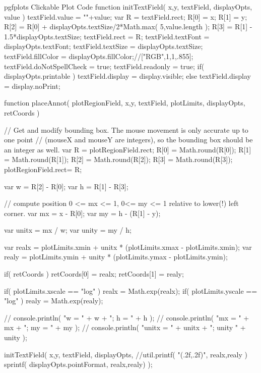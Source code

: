 {{\begin{insDLJS}[processAnnotatedPlot]{\jobname}{pgfplots Clickable Plot Code}
function initTextField( x,y, textField, displayOpts, value )
{
	textField.value = ""+value;
	var R = textField.rect;
	R[0] = x;
	R[1] = y;
	R[2] = R[0] + displayOpts.textSize/2*Math.max( 5,value.length );
	R[3] = R[1] - 1.5*displayOpts.textSize;
	textField.rect = R;
	textField.textFont = displayOpts.textFont;
	textField.textSize = displayOpts.textSize;
	textField.fillColor = displayOpts.fillColor;//["RGB",1,1,.855];
	textField.doNotSpellCheck = true;
	textField.readonly = true;
	if( displayOpts.printable )
		textField.display = display.visible;
	else
		textField.display = display.noPrint;
}

function placeAnnot( plotRegionField, x,y, textField, plotLimits, displayOpts, retCoords )
{
	// Get and modify bounding box. The mouse movement is only accurate up to one point 
	// (mouseX and mouseY are integers), so the bounding box should be an integer as well.
	var R = plotRegionField.rect;
	R[0] = Math.round(R[0]);
	R[1] = Math.round(R[1]);
	R[2] = Math.round(R[2]);
	R[3] = Math.round(R[3]);
	plotRegionField.rect= R;

	var w = R[2] - R[0];
	var h = R[1] - R[3];

	// compute position 0 <= mx <= 1, 0<= my <= 1 relative to lower(!) left corner.
	var mx = x - R[0];
	var my = h - (R[1] - y);

	var unitx = mx / w;
	var unity = my / h;

	var realx = plotLimits.xmin + unitx * (plotLimits.xmax - plotLimits.xmin);
	var realy = plotLimits.ymin + unity * (plotLimits.ymax - plotLimits.ymin);

	if( retCoords ) {
		retCoords[0] = realx;
		retCoords[1] = realy;
	}

	if( plotLimits.xscale == "log" )
		realx = Math.exp(realx);
	if( plotLimits.yscale == "log" )
		realy = Math.exp(realy);

//	console.println( "w = " + w + "; h = " + h );
//	console.println( "mx = " + mx + "; my = " + my );
//	console.println( "unitx = " + unitx + "; unity " + unity );

	initTextField( x,y, textField, displayOpts,
		//util.printf( "(\pgfplotsPERCENT.2f,\pgfplotsPERCENT.2f)", realx,realy )
		sprintf( displayOpts.pointFormat, realx,realy) );

}


\end{insDLJS}}}
